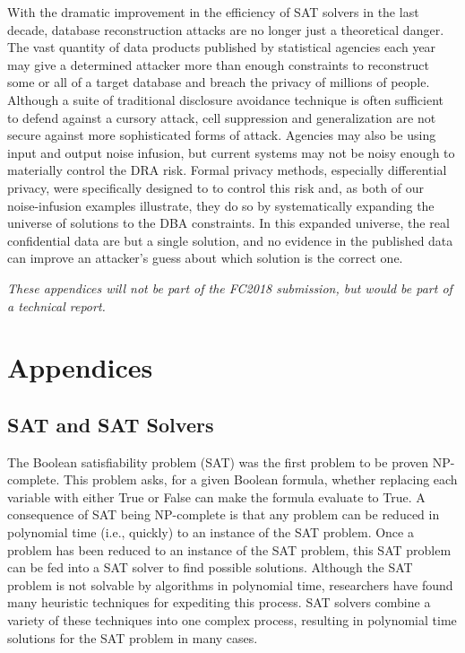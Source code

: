 \documentclass[runningheads]{llncs}
\newif\iflongversion
\newcommand{\citelong}[1]{}
\newcommand{\citelong}[1]{\cite{#1}}
\begin{document}
With the dramatic improvement in the efficiency of SAT solvers in the
last decade, database reconstruction attacks are no longer just a 
theoretical danger. The vast quantity of data products published by
statistical agencies each year may give a determined attacker 
more than enough constraints to reconstruct some or all of a target database and
breach the privacy of millions of people. Although a suite of traditional
disclosure avoidance technique is often sufficient to defend against a cursory attack, cell suppression and generalization are not secure against more sophisticated
forms of attack. Agencies may also be using input and output noise infusion, but 
current systems may not be noisy enough to materially control the DRA risk.
Formal privacy methods, especially differential privacy, were specifically
designed to to control this risk and, as both of our noise-infusion examples
illustrate, they do so by systematically expanding the universe of solutions
to the DBA constraints. In this expanded universe, the real confidential data
are but a single solution, and no evidence in the published data can improve 
an attacker's guess about which solution is the correct one.

\iflongversion \section{References}\fi



\iflongversion
\newpage
\emph{These appendices will not be part of the FC2018 submission, but
  would be part of a technical report.}

\section{Appendices}

\subsection{SAT and SAT Solvers}

The Boolean satisfiability problem (SAT) was the first
problem to be proven NP-complete\citelong{cooklevin}. This problem asks,
for a given Boolean formula, whether replacing each variable with
either True or False can make the formula evaluate to True.  A
consequence of SAT being NP-complete is that any problem can be
reduced in polynomial time (i.e., quickly) to an instance of the SAT
problem. Once a problem has been reduced to an instance of the SAT
problem, this SAT problem can be fed into a SAT solver to find
possible solutions. Although the SAT problem is not solvable by
algorithms in polynomial time, researchers have found many heuristic
techniques for expediting this process. SAT solvers combine a variety
of these techniques into one complex process, resulting in polynomial
time solutions for the SAT problem in many cases.
\end{document}
